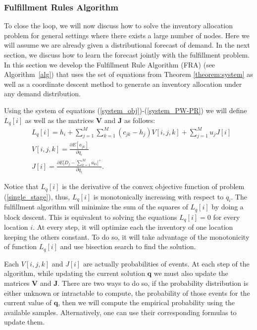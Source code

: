 \documentclass[poms,final,blindrev]{poms1_V1} %
\begin{document}
\subsubsection{Fulfillment Rules Algorithm}
\label{algo_section}

To close the loop, we will now discuss how to solve the inventory allocation problem for general settings where there exists a large number of nodes. Here we will assume we are already given a distributional forecast of demand. In the next section, we discuss how to learn the forecast jointly with the fulfillment problem. In this section we develop the Fulfillment Rule Algorithm (FRA) (see Algorithm~\ref{alg}) that uses the set of equations from Theorem \ref{theorem:system} as well as a coordinate descent method to generate an inventory allocation under any demand distribution.


Using the system of equations (\ref{system_obj})-(\ref{system_PW-PR}) we will define $L_q[i]$ as well as the matrices $\boldsymbol{V}$ and $\boldsymbol{J}$ as follows:  
\begin{equation}
\begin{aligned}
& L_q[i] = h_i + \sum_{j=1}^{M} \sum_{k=1}^{M} (c_{jk} -h_j)  V[i,j,k] 
+  
\sum_{j = 1}^{M} u_{j} J[i]\\
&  V[i,j,k] = \frac{\partial E[a_{jk}]}{\partial q_i} \\
&  J[i] = \frac{\partial E\big[ D_j - \sum_{k=1}^{M}  a_{ki}\big]^+}{\partial q_i}.
\end{aligned}
\end{equation}

Notice that $L_q[i]$ is the derivative of the convex objective function of problem (\ref{single_stage}), thus, $L_q[i]$ is monotonically increasing with respect to $q_i$.
The fulfillment algorithm will minimize the sum of the squares of $L_q[i]$ by doing a block descent. This is equivalent to solving the equations $L_q[i]=0$ for every location $i$. 
At every step, it will optimize each the inventory of one location keeping the others constant. 
To do so, it will take advantage of the monotonicity of function $L_q[i]$ and use bisection search to find the solution.

Each $V[i,j,k]$ and $J[i]$ are actually probabilities of events. At each step of the algorithm, while updating the current solution $\boldsymbol{q}$ we must also update the matrices $\boldsymbol{V}$ and $\boldsymbol{J}$. 
There are two ways to do so, if the probability distribution is either  unknown or intractable to compute, the probability of those events for the current value of $\boldsymbol{q}$, then we will compute the empirical probability using the available samples. Alternatively, one can use their corresponding formulas to update them. 
\end{document}
